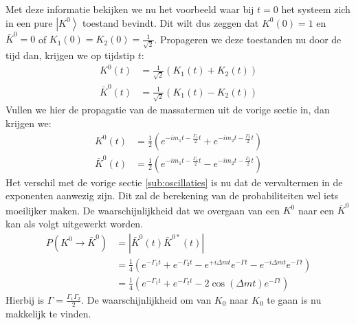 \documentclass[../main.tex]{subfiles}
\begin{document}
Met deze informatie bekijken we nu het voorbeeld waar bij $t=0$ het systeem zich in een pure $\left| K^0 \right>$ toestand bevindt. Dit wilt dus zeggen dat $K^0(0) = 1$ en $\bar{K}^0 = 0$ of $K_1(0)=K_2(0)= \frac{1}{\sqrt{2}} $. Propageren we deze toestanden nu door de tijd dan, krijgen we op tijdstip $t$:
\begin{equation}
    \begin{aligned}
        \label{eq:voorbeeld_kaon_osc_tijd_prop_1}
        K^{0}(t) &=\frac{1}{\sqrt{2}}\left(K_{1}(t)+K_{2}(t)\right) \\
        \bar{K}^{0}(t) &=\frac{1}{\sqrt{2}}\left(K_{1}(t)-K_{2}(t)\right)
    \end{aligned}
\end{equation}
Vullen we hier de propagatie van de massatermen uit de vorige sectie in, dan krijgen we:
\begin{equation}
    \begin{aligned}
        \label{eq:voorbeeld_kaon_osc_tijd_prop_2}
        K^{0}(t) &=\frac{1}{2}\left(e^{-i m_{1} t-\frac{\Gamma_{1}}{2} t}+e^{-i m_{2} t-\frac{\Gamma_{2}}{2} t}\right) \\
        \bar{K}^{0}(t) &=\frac{1}{2}\left(e^{-i m_{1} t-\frac{\Gamma_{1}}{2} t}-e^{-i m_{2} t-\frac{\Gamma_{2}}{2} t}\right)
    \end{aligned}
\end{equation}
Het verschil met de vorige sectie \ref{sub:oscillaties} is nu dat de vervaltermen in de exponenten aanwezig zijn. Dit zal de berekening van de probabiliteiten wel iets moeilijker maken. De waarschijnlijkheid dat we overgaan van een $K^0$ naar een $\bar{K}^0$ kan als volgt uitgewerkt worden.
\begin{equation}
    \begin{aligned}
        \label{eq:voorbeeld_kaon_osc_tijd_prop_3}
        P\left(K^{0} \rightarrow \bar{K}^{0}\right) &=\left|\bar{K}^{0}(t) \bar{K}^{0 *}(t)\right| \\
                                                    &=\frac{1}{4}\left(e^{-\Gamma_{1} t}+e^{-\Gamma_{2} t}-e^{+i \Delta m t} e^{-\Gamma t}-e^{-i \Delta m t} e^{-\Gamma t}\right) \\
                                                    &=\frac{1}{4}\left(e^{-\Gamma_{1} t}+e^{-\Gamma_{2} t}-2 \cos (\Delta m t) e^{-\Gamma t}\right)
    \end{aligned}
\end{equation}
Hierbij is $\Gamma = \frac{\Gamma_1 \Gamma_2}{2}$. De waarschijnlijkheid om van $K_0$ naar $K_0$ te gaan is nu makkelijk te vinden.
\end{document}
